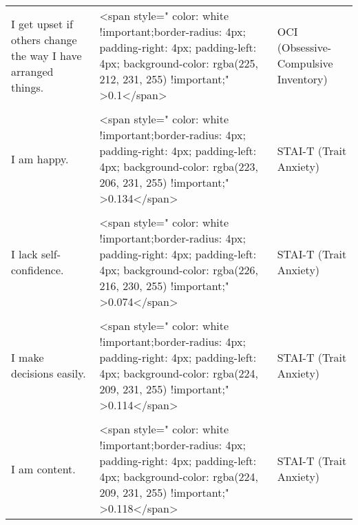 \documentclass[border=1mm]{standalone}
\begin{document}
\begin{longtable}{lll}
I get upset if others change the way I have arranged things. & <span style="     color: white !important;border-radius: 4px; padding-right: 4px; padding-left: 4px; background-color: rgba(225, 212, 231, 255) !important;" >0.1</span> & OCI (Obsessive-Compulsive Inventory)\\
\cellcolor{gray!10}{I feel pleasant.} & \cellcolor{gray!10}{<span style="     color: white !important;border-radius: 4px; padding-right: 4px; padding-left: 4px; background-color: rgba(224, 207, 231, 255) !important;" >0.128</span>} & \cellcolor{gray!10}{STAI-T (Trait Anxiety)}\\
\addlinespace
I am happy. & <span style="     color: white !important;border-radius: 4px; padding-right: 4px; padding-left: 4px; background-color: rgba(223, 206, 231, 255) !important;" >0.134</span> & STAI-T (Trait Anxiety)\\
\cellcolor{gray!10}{I have disturbing thoughts.} & \cellcolor{gray!10}{<span style="     color: white !important;border-radius: 4px; padding-right: 4px; padding-left: 4px; background-color: rgba(221, 198, 232, 255) !important;" >0.183</span>} & \cellcolor{gray!10}{STAI-T (Trait Anxiety)}\\
I lack self-confidence. & <span style="     color: white !important;border-radius: 4px; padding-right: 4px; padding-left: 4px; background-color: rgba(226, 216, 230, 255) !important;" >0.074</span> & STAI-T (Trait Anxiety)\\
\cellcolor{gray!10}{I feel secure.} & \cellcolor{gray!10}{<span style="     color: white !important;border-radius: 4px; padding-right: 4px; padding-left: 4px; background-color: rgba(225, 211, 231, 255) !important;" >0.103</span>} & \cellcolor{gray!10}{STAI-T (Trait Anxiety)}\\
I make decisions easily. & <span style="     color: white !important;border-radius: 4px; padding-right: 4px; padding-left: 4px; background-color: rgba(224, 209, 231, 255) !important;" >0.114</span> & STAI-T (Trait Anxiety)\\
\addlinespace
\cellcolor{gray!10}{I feel inadequate.} & \cellcolor{gray!10}{<span style="     color: white !important;border-radius: 4px; padding-right: 4px; padding-left: 4px; background-color: rgba(223, 205, 232, 255) !important;" >0.137</span>} & \cellcolor{gray!10}{STAI-T (Trait Anxiety)}\\
I am content. & <span style="     color: white !important;border-radius: 4px; padding-right: 4px; padding-left: 4px; background-color: rgba(224, 209, 231, 255) !important;" >0.118</span> & STAI-T (Trait Anxiety)\\

\end{longtable}
\end{document}
